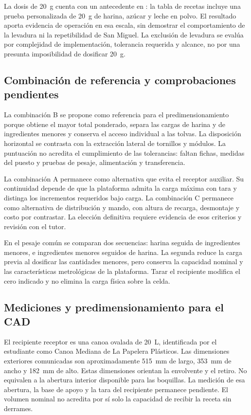 La dosis de 20~g cuenta con un antecedente en
\textcite{humaira2024optimalisasi}: la tabla de recetas incluye una
prueba personalizada de 20~g de harina, azúcar y leche en polvo.
El resultado aporta evidencia de operación en esa escala, sin
demostrar el comportamiento de la levadura ni la repetibilidad de
San Miguel. La exclusión de levadura se evalúa por complejidad de
implementación, tolerancia requerida y alcance, no por una presunta
imposibilidad de dosificar 20~g.

\subsection{Combinación de referencia y comprobaciones pendientes}

La combinación B se propone como referencia para el predimensionamiento
porque obtiene el mayor total ponderado, separa las cargas de harina y
de ingredientes menores y conserva el acceso individual a las tolvas.
La disposición horizontal se contrasta con la extracción lateral de
tornillos y módulos. La puntuación no acredita el cumplimiento de las
tolerancias: faltan fichas, medidas del puesto y pruebas de pesaje,
alimentación y transferencia.

La combinación A permanece como alternativa que evita el receptor
auxiliar. Su continuidad depende de que la plataforma admita la carga
máxima con tara y distinga los incrementos requeridos bajo carga. La
combinación C permanece como alternativa de distribución y mando, con
altura de recarga, desmontaje y costo por contrastar. La elección
definitiva requiere evidencia de esos criterios y revisión con el tutor.

En el pesaje común se comparan dos secuencias: harina seguida de
ingredientes menores, e ingredientes menores seguidos de harina. La
segunda reduce la carga previa al dosificar las cantidades menores,
pero conserva la capacidad nominal y las características metrológicas
de la plataforma. Tarar el recipiente modifica el cero indicado y no
elimina la carga física sobre la celda.

\subsection{Mediciones y predimensionamiento para el CAD}

El recipiente receptor es una canoa ovalada de 20~L, identificada por
el estudiante como Canoa Mediana de La Papelera Plásticos. Las
dimensiones exteriores comunicadas son aproximadamente
515~mm de largo, 353~mm de ancho y 182~mm de alto. Estas dimensiones
orientan la envolvente y el retiro. No equivalen a la abertura interior
disponible para las boquillas. La medición de esa abertura, la base de
apoyo y la tara del recipiente permanece pendiente. El volumen nominal
no acredita por sí solo la capacidad de recibir la receta sin derrames.

